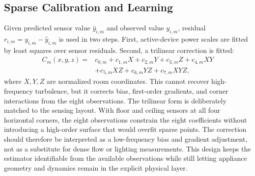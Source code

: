 \documentclass[conference,a4paper]{IEEEtran}
\begin{document}
\subsection{Sparse Calibration and Learning}
Given predicted sensor value $\hat y_{i,m}$ and observed value $y_{i,m}$, residual $r_{i,m}=y_{i,m}-\hat y_{i,m}$ is used in two steps. First, active-device power scales are fitted by least squares over sensor residuals. Second, a trilinear correction is fitted:
\begin{align}
C_m(x,y,z)={}&c_{0,m}+c_{1,m}X+c_{2,m}Y+c_{3,m}Z+c_{4,m}XY\nonumber\\
&+c_{5,m}XZ+c_{6,m}YZ+c_{7,m}XYZ,
\end{align}
where $X,Y,Z$ are normalized room coordinates. This cannot recover high-frequency turbulence, but it corrects bias, first-order gradients, and corner interactions from the eight observations.
The trilinear form is deliberately matched to the sensing layout. With floor and ceiling sensors at all four horizontal corners, the eight observations constrain the eight coefficients without introducing a high-order surface that would overfit sparse points. The correction should therefore be interpreted as a low-frequency bias and gradient adjustment, not as a substitute for dense flow or lighting measurements. This design keeps the estimator identifiable from the available observations while still letting appliance geometry and dynamics remain in the explicit physical layer.
\end{document}
